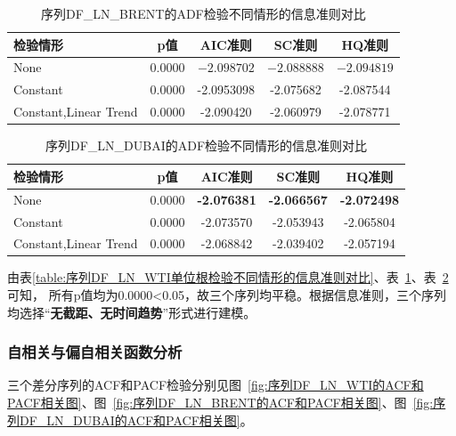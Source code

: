 \documentclass[12pt,a4paper]{ctexart}
\begin{document}
\begin{table}[H]
\centering
\caption{序列DF\_LN\_BRENT的ADF检验不同情形的信息准则对比}
\label{table:序列DF_LN_BRENT的ADF检验不同情形的信息准则对比}
\begin{tabular}{lcccc}
\toprule[1.2pt] %
检验情形 & p值 &  AIC准则 & SC准则 & HQ准则 \\
\midrule[0.75pt] %
None & 0.0000 & $\mathbf{-2.098702}$ & $\mathbf{-2.088888}$ & $\mathbf{-2.094819}$ \\
Constant & 0.0000 & -2.0953098 & -2.075682 & -2.087544 \\
Constant,Linear Trend & 0.0000 & -2.090420 & -2.060979 & -2.078771 \\
\bottomrule[1.2pt] %
\end{tabular}
\end{table}

\begin{table}[H]
\centering
\caption{序列DF\_LN\_DUBAI的ADF检验不同情形的信息准则对比}
\label{table:序列DF_LN_DUBAI的ADF检验不同情形的信息准则对比}
\begin{tabular}{lcccc}
\toprule[1.2pt]
检验情形 & p值 & AIC准则 & SC准则 & HQ准则 \\
\midrule[0.75pt]
None & 0.0000 & \textbf{-2.076381} & \textbf{-2.066567} & \textbf{-2.072498} \\
Constant & 0.0000 & -2.073570 & -2.053943 & -2.065804 \\
Constant,Linear Trend & 0.0000 & -2.068842 & -2.039402 & -2.057194 \\
\bottomrule[1.2pt]
\end{tabular}
\end{table}

由表\ref{table:序列DF_LN_WTI单位根检验不同情形的信息准则对比}、表~\ref{table:序列DF_LN_BRENT的ADF检验不同情形的信息准则对比}、表~\ref{table:序列DF_LN_DUBAI的ADF检验不同情形的信息准则对比}可知，
所有p值均为0.0000<0.05，故三个序列均平稳。根据信息准则，三个序列均选择“\textbf{无截距、无时间趋势}”形式进行建模。


\subsubsection{自相关与偏自相关函数分析}

三个差分序列的ACF和PACF检验分别见图~\ref{fig:序列DF_LN_WTI的ACF和PACF相关图}、图~\ref{fig:序列DF_LN_BRENT的ACF和PACF相关图}、图~\ref{fig:序列DF_LN_DUBAI的ACF和PACF相关图}。

\end{document}
